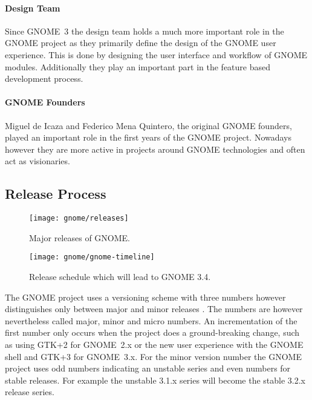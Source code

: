 \paragraph{Design Team}

Since GNOME~3 the design team holds a much more important role in the GNOME
project as they primarily define the design of the GNOME user experience. This
is done by designing the user interface and workflow of GNOME modules.
Additionally they play an important part in the feature based development
process.

\paragraph{GNOME Founders}

Miguel de Icaza and Federico Mena Quintero, the original GNOME founders, played
an important role in the first years of the GNOME project. Nowadays however
they are more active in projects around GNOME technologies and often act as
visionaries.


\subsection{Release Process} %

\begin{figure}[htbp]
  \centering
  \texttt{[image: gnome/releases]}
  \caption[Major Releases of GNOME]{Major releases of GNOME.}
\end{figure}

\begin{figure}[hbtp]
  \centering
  \texttt{[image: gnome/gnome-timeline]}
  \caption[GNOME 3.4 Release Schedule]{Release schedule which will lead to GNOME 3.4.}
\end{figure}

The GNOME project uses a versioning scheme with three numbers however
distinguishes only between major and minor releases
\cite{GNOMEDevelopmentSchedule,GNOMESchedule}. The numbers are however
nevertheless called major, minor and micro numbers. An incrementation of the
first number only occurs when the project does a ground-breaking change, such
as using \ac{GTK}+2 for GNOME~2.x or the new user experience with the GNOME shell
and \ac{GTK}+3 for GNOME~3.x. For the minor version number the GNOME project uses
odd numbers indicating an unstable series and even numbers for stable releases.
For example the unstable 3.1.x series will become the stable 3.2.x release
series.

